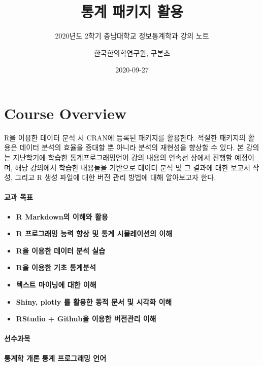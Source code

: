 \documentclass[
  11pt,
]{krantz}
\title{통계 패키지 활용}
\subtitle{2020년도 2학기 충남대학교 정보통계학과 강의 노트}
\author{한국한의학연구원, 구본초}
\date{2020-09-27}
\makeatletter
\providecommand{\tightlist}{%
  \setlength{\itemsep}{0pt}\setlength{\parskip}{0pt}}
\newenvironment{kframe}{%
\medskip{}
\setlength{\fboxsep}{.8em}
 \def\at@end@of@kframe{}%
 \ifinner\ifhmode%
  \def\at@end@of@kframe{\end{minipage}}%
  \begin{minipage}{\columnwidth}%
 \fi\fi%
 \def\FrameCommand##1{\hskip\@totalleftmargin \hskip-\fboxsep
 \colorbox{shadecolor}{##1}\hskip-\fboxsep
     \hskip-\linewidth \hskip-\@totalleftmargin \hskip\columnwidth}%
 \MakeFramed {\advance\hsize-\width
   \@totalleftmargin\z@ \linewidth\hsize
   \@setminipage}}%
 {\par\unskip\endMakeFramed%
 \at@end@of@kframe}
\renewenvironment{quote}{\begin{kframe}}{\end{kframe}}
\makeatother
\begin{document}
\maketitle

{
\hypersetup{linkcolor=}
\setcounter{tocdepth}{2}
\tableofcontents
}
\listoftables
\listoffigures
\hypertarget{overview}{%
\chapter*{Course Overview}\label{overview}}


R을 이용한 데이터 분석 시 CRAN에 등록된 패키지를 활용한다. 적절한 패키지의 활용은 데이터 분석의 효율을 증대할 뿐 아니라 분석의 재현성을 향상할 수 있다. 본 강의는 지난학기에 학습한 통계프로그래밍언어 강의 내용의 연속선 상에서 진행할 예정이며, 해당 강의에서 학습한 내용들을 기반으로 데이터 분석 및 그 결과에 대한 보고서 작성, 그리고 R 생성 파일에 대한 버전 관리 방법에 대해 알아보고자 한다.

\hypertarget{purpose-course}{%
\subsubsection*{교과 목표}\label{purpose-course}}


\begin{quote}
\begin{itemize}
\tightlist
\item
  \textbf{R Markdown의 이해와 활용}
\item
  \textbf{R 프로그래밍 능력 향상 및 통계 시뮬레이션의 이해}
\item
  \textbf{R을 이용한 데이터 분석 실습}
\item
  \textbf{R을 이용한 기초 통계분석}
\item
  \textbf{텍스트 마이닝에 대한 이해}
\item
  \textbf{Shiny, plotly 를 활용한 동적 문서 및 시각화 이해}
\item
  \textbf{RStudio + Github을 이용한 버전관리 이해}
\end{itemize}
\end{quote}

\hypertarget{pre-course}{%
\subsubsection*{선수과목}\label{pre-course}}


\begin{quote}
\textbf{통계학 개론}
\textbf{통계 프로그래밍 언어}
\end{quote}
\end{document}
